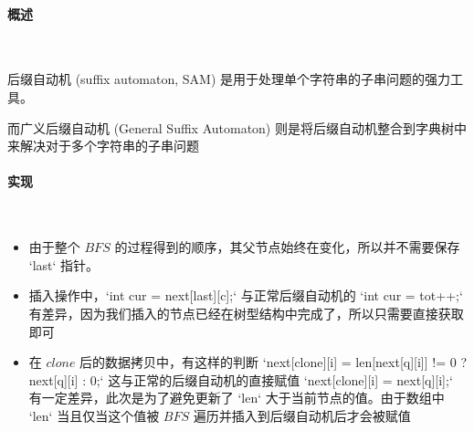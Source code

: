 \paragraph{概述}~{}
\par
后缀自动机 (suffix automaton, SAM) 是用于处理单个字符串的子串问题的强力工具。\par
而广义后缀自动机 (General Suffix Automaton) 则是将后缀自动机整合到字典树中来解决对于多个字符串的子串问题\par

\paragraph{实现}~{}
\par
\begin{itemize}
    \item 由于整个 $BFS$ 的过程得到的顺序，其父节点始终在变化，所以并不需要保存 `last` 指针。
    \item 插入操作中，`int cur = next[last][c];` 与正常后缀自动机的 `int cur = tot++;` 有差异，因为我们插入的节点已经在树型结构中完成了，所以只需要直接获取即可
    \item 在 $clone$ 后的数据拷贝中，有这样的判断 `next[clone][i] = len[next[q][i]] != 0 ? next[q][i] : 0;` 这与正常的后缀自动机的直接赋值 `next[clone][i] = next[q][i];` 有一定差异，此次是为了避免更新了 `len` 大于当前节点的值。由于数组中 `len` 当且仅当这个值被 $BFS$ 遍历并插入到后缀自动机后才会被赋值
\end{itemize}
